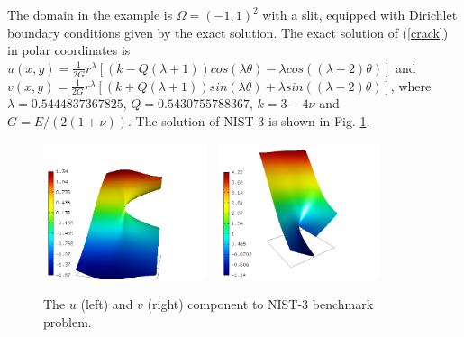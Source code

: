 \documentclass[12pt]{elsarticle}
\begin{document}
The domain in the example is $\Omega = (-1, 1)^2$ with a slit,
equipped with Dirichlet boundary conditions given by the
exact solution. The exact solution of (\ref{crack}) in polar coordinates is
$u(x, y) = \frac{1}{2G} r^{\lambda}[(k - Q(\lambda + 1))cos(\lambda \theta) - \lambda cos((\lambda - 2) \theta)]$ and
$v(x, y) = \frac{1}{2G} r^{\lambda}[(k + Q(\lambda + 1))sin(\lambda \theta) + \lambda sin((\lambda - 2) \theta)]$,
where $\lambda = 0.5444837367825$, $Q = 0.5430755788367$,
$k = 3 - 4 \nu$ and $G = E / (2(1 + \nu))$.
The solution of NIST-3 is shown in Fig. \ref{fig:sln-nist03}.

\begin{figure}[H]
\centering
\vspace{-5mm}
\includegraphics[height=40mm]{nist/nist-3/solution-u.png}\ \
\includegraphics[height=40mm]{nist/nist-3/solution-v.png}
\vspace{-2mm}
\caption{The $u$ (left) and $v$ (right) component to NIST-3 benchmark problem.}
\vspace{-5mm}
\label{fig:sln-nist03}
\end{figure}
\end{document}
